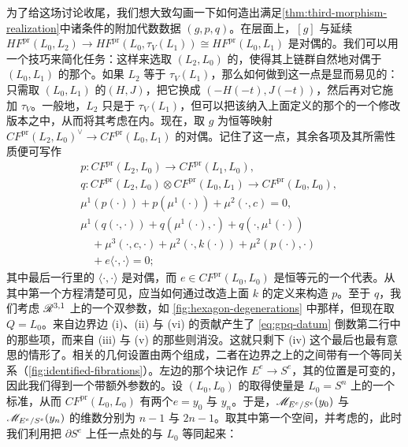 \begin{remark}\label{thm:additional-data-gpq}
为了给这场讨论收尾，我们想大致勾画一下如何造出满足\cref{thm:third-morphism-realization}中诸条件的附加代数数据 $(g,p,q)$。在\trCohomology{}层面上，$[g]$ 与延续\trIsomorphism
$HF^{\mathrm{pr}}(L_0,L_2)\to HF^{\mathrm{pr}}(L_0,\tau_V(L_1))\cong HF^{\mathrm{pr}}(L_0,L_1)$ 是\trPoincare{}对偶的。我们可以用一个技巧来简化任务：这样来选取 $(L_2,L_0)$ 的\trFloerDatum，使得其上链群自然地对偶于 $(L_0,L_1)$ 的那个。如果 $L_2$ 等于 $\tau_V(L_1)$，那么如何做到这一点是显而易见的：只需取 $(L_0,L_1)$ 的\trFloerDatum{}$(H,J)$，把它换成 $(-H(-t),J(-t))$，然后再对它施加 $\tau_V$。一般地，$L_2$ 只是\trIsotopy{}于 $\tau_V(L_1)$，但可以把该\trIsotopy{}纳入上面定义的那个\trFloerDatum{}的一个修改版本之中，从而将其考虑在内。现在，取 $g$ 为恒等映射 $CF^{\mathrm{pr}}(L_2,L_0)^{\vee}\to CF^{\mathrm{pr}}(L_0,L_1)$ 的对偶。记住了这一点，其余各项及其所需性质便可写作
\begin{equation}\label{eq:gpq-datum}
\boxed{\begin{aligned}
&p\colon CF^{\mathrm{pr}}(L_2,L_0)\longrightarrow CF^{\mathrm{pr}}(L_1,L_0),\\
&q\colon CF^{\mathrm{pr}}(L_2,L_0)\otimes CF^{\mathrm{pr}}(L_0,L_1)\longrightarrow CF^{\mathrm{pr}}(L_0,L_0),\\
&\mu^1(p(\cdot))+p(\mu^1(\cdot))+\mu^2(\cdot,c)=0,\\
&\mu^1(q(\cdot,\cdot))+q(\mu^1(\cdot),\cdot)+q(\cdot,\mu^1(\cdot))\\
&\quad+\mu^3(\cdot,c,\cdot)+\mu^2(\cdot,k(\cdot))+\mu^2(p(\cdot),\cdot)\\
&\quad+e\langle\cdot,\cdot\rangle=0;
\end{aligned}}
\end{equation}
其中最后一行里的 $\langle\cdot,\cdot\rangle$ 是对偶\trPairing，而 $e\in CF^{\mathrm{pr}}(L_0,L_0)$ 是\trCohomology{}恒等元的一个代表。从其中第一个方程清楚可见，应当如何通过改造上面 $k$ 的定义来构造 $p$。至于 $q$，我们考虑 $\mathscr{R}^{3,1}$ 上的一个双参数\trFamily，如 \cref{fig:hexagon-degenerations} 中那样，但现在取 $Q=L_0$。来自边界边 (i)、(ii) 与 (vi) 的贡献产生了 \eqref{eq:gpq-datum} 倒数第二行中的那些项，而来自 (iii) 与 (v) 的那些则消没。这就只剩下 (iv) 这个最后也最有意思的情形了。相关的几何设置由两个\trLefschetzFibration{}组成，二者在边界\trMarkedPoint{}之上的\trFiber{}之间带有一个等同关系（\cref{fig:identified-fibrations}）。左边的那个块记作 $E^e\to S^e$，其\trMarkedPoint{}的位置是可变的，因此我们得到一个带额外参数的\trEvaluationMap。设 $(L_0,L_0)$ 的\trFloerDatum{}取得使\trHamilton{}量是 $L_0=S^n$ 上的一个标准\trMorseFunction，从而 $CF^{\mathrm{pr}}(L_0,L_0)$ 有两个\trGenerator{}$e=y_0$ 与 $y_n$。于是，\trModuliSpace{}$\mathscr{M}_{E^e/S^e}(y_0)$ 与 $\mathscr{M}_{E^e/S^e}(y_n)$ 的维数分别为 $n-1$ 与 $2n-1$。取其中第一个空间，并考虑\trParametrization{}的\trEvaluationMap，此时我们利用\trParallelTransport{}把 $\partial S^e$ 上任一点处的\trLagrange\trBoundaryCondition{}与 $L_0$ 等同起来：

\end{remark}
